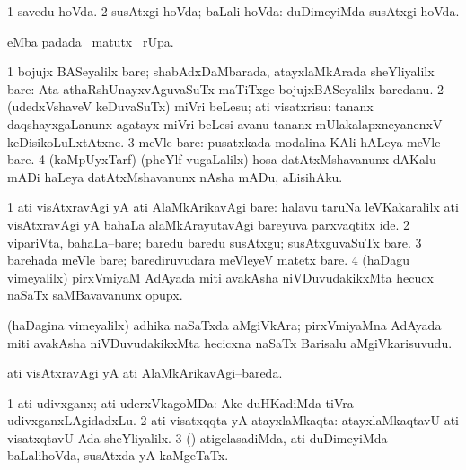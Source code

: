 \bentry
{}
\gl{\gu}
\bmng
\bnum
\num{1} savedu hoVda. 
\num{2} susAtxgi hoVda; baLali hoVda:  duDimeyiMda susAtxgi hoVda. 
\enum
\emng
\eentry

\bentry
{}
\gl{\kirx}
\bmng
{} eMba padada \BU\ matutx \BUkaq\ rUpa. 
\emng
\eentry

\bentry
{}
\gl{\kirx}
\bmng
\bnum
\num{1} bojujx BASeyalilx bare; shabAdxDaMbarada, atayxlaMkArada sheYliyalilx bare:  Ata athaRshUnayxvAguvaSuTx maTiTxge bojujxBASeyalilx baredanu. 
\num{2} (udedxVshaveV keDuvaSuTx) miVri beLesu; ati visatxrisu:  tananx daqshayxgaLanunx agatayx miVri beLesi avanu tananx mUlakalapxneyanenxV keDisikoLuLxtAtxne. 
\num{3} meVle bare:  pusatxkada modalina KAli hALeya meVle bare. 
\num{4} (kaMpUyxTarf) (pheYlf \mo vugaLalilx) hosa datAtxMshavanunx dAKalu mADi haLeya datAtxMshavanunx nAsha mADu, aLisihAku. 
\enum
\emng

\noindent
\gl{\akirx}
\bmng
\bnum
\num{1} ati visAtxravAgi yA ati AlaMkArikavAgi bare:  halavu taruNa leVKakaralilx ati visAtxravAgi yA bahaLa alaMkArayutavAgi bareyuva parxvaqtitx ide. 
\num{2} vipariVta, bahaLa--bare; baredu baredu susAtxgu; susAtxguvaSuTx bare. 
\num{3} barehada meVle bare; barediruvudara meVleyeV matetx bare. 
\num{4} (haDagu vimeyalilx) pirxVmiyaM AdAyada miti avakAsha niVDuvudakikxMta hecucx naSaTx saMBavavanunx opupx. 
\enum
\emng
\eentry

\bentry
{}
\gl{\nA}
\bmng
(haDagina vimeyalilx) adhika naSaTxda aMgiVkAra; pirxVmiyaMna AdAyada miti avakAsha niVDuvudakikxMta hecicxna naSaTx Barisalu aMgiVkarisuvudu. 
\emng
\eentry

\bentry
{}
\gl{\gu}
\bmng
ati visAtxravAgi yA ati AlaMkArikavAgi--bareda. 
\emng
\eentry

\bentry
{}
\gl{\gu}
\bmng
\bnum
\num{1} ati udivxganx; ati uderxVkagoMDa:  Ake duHKadiMda tiVra udivxganxLAgidadxLu. 
\num{2} ati visatxqqta yA atayxlaMkaqta:  atayxlaMkaqtavU ati visatxqtavU Ada sheYliyalilx. 
\num{3} (\pArxparx) atigelasadiMda, ati duDimeyiMda--baLalihoVda, susAtxda yA kaMgeTaTx. 
\enum
\emng
\eentry

